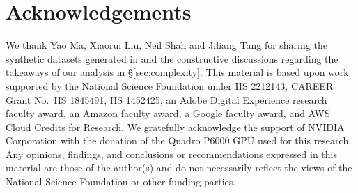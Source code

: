 
\section*{Acknowledgements}
We thank Yao Ma, Xiaorui Liu, Neil Shah and Jiliang Tang for sharing the synthetic datasets generated in \cite{ma2021homophily} and the constructive discussions regarding the takeaways of our analysis in \S\ref{sec:complexity}. This material is based upon work supported by the National Science Foundation under IIS 2212143,  CAREER Grant No.~IIS 1845491,  IIS 1452425, 
an Adobe Digital Experience research faculty award, an Amazon faculty award, a Google faculty award, 
and AWS Cloud Credits for Research. We gratefully acknowledge the support of NVIDIA Corporation with the donation of the Quadro P6000 GPU used for this research. 
Any opinions, findings, and conclusions or recommendations expressed in this material are those of the author(s) and do not necessarily reflect the views of the National Science Foundation or other funding parties.

